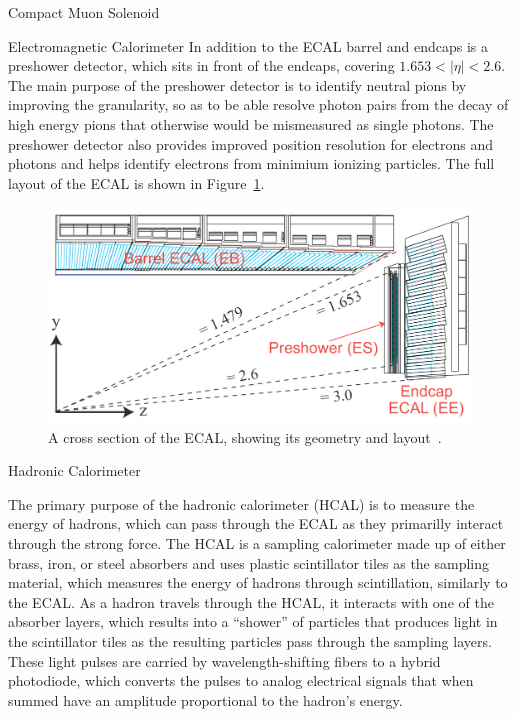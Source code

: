 \begin{section}{Compact Muon Solenoid}
\begin{subsection}{Electromagnetic Calorimeter}
In addition to the ECAL barrel and endcaps is a preshower detector, which sits in front of the endcaps, covering $1.653 < |\eta| < 2.6$.
The main purpose of the preshower detector is to identify neutral pions by improving the granularity, so as to be able resolve photon pairs from the decay of high energy pions that otherwise would be mismeasured as single photons. 
The preshower detector also provides improved position resolution for electrons and photons and helps identify electrons from minimium ionizing particles.
The full layout of the ECAL is shown in Figure~\ref{fig:cms_ecal}.

\begin{figure}[tbp!]
\begin{center}
\includegraphics[angle=0,width=0.80\columnwidth]{fig/cms_ecal.png}
\end{center}
\caption{A cross section of the ECAL, showing its geometry and layout~\cite{Isildak:2013kfa}.}
\label{fig:cms_ecal}
\end{figure}

\end{subsection}

\begin{subsection}{Hadronic Calorimeter}
\label{subsec:hcal}

The primary purpose of the hadronic calorimeter (HCAL) is to measure the energy of hadrons, which can pass through the ECAL as they primarilly interact through the strong force.
The HCAL is a sampling calorimeter made up of either brass, iron, or steel absorbers and uses plastic scintillator tiles as the sampling material, which measures the energy of hadrons through scintillation, similarly to the ECAL.
As a hadron travels through the HCAL, it interacts with one of the absorber layers, which results into a ``shower'' of particles that produces light in the scintillator tiles as the resulting particles pass through the sampling layers.
These light pulses are carried by wavelength-shifting fibers to a hybrid photodiode, which converts the pulses to analog electrical signals that when summed have an amplitude proportional to the hadron's energy. 


\end{subsection}
\end{section}
